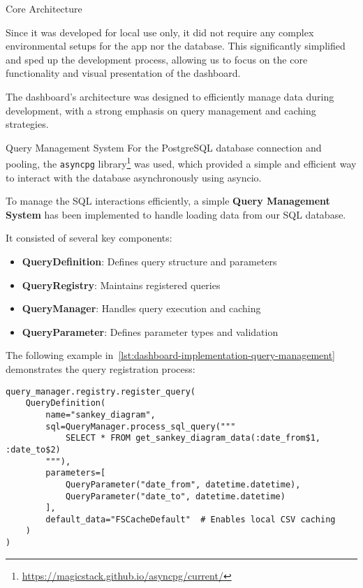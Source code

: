 \begin{section}{Core Architecture}
	\label{sec:implementation-core-architecture}

	Since it was developed for local use only, it did not require any complex environmental setups for the app nor the database.
	This significantly simplified and sped up the development process, allowing us to focus on the core functionality and visual presentation of the dashboard.

	The dashboard's architecture was designed to efficiently manage data during development, with a strong emphasis on query management and caching strategies.

	\begin{subsection}{Query Management System}
		\label{subsec:implementation-core-architecture-query-management}
		For the PostgreSQL database connection and pooling, the \texttt{asyncpg} library\footnote{\url{https://magicstack.github.io/asyncpg/current/}} was used,
		which provided a simple and efficient way to interact with the database asynchronously using asyncio.

		To manage the SQL interactions efficiently, a simple \textbf{Query Management System} has been implemented to handle loading data from our SQL database.

		It consisted of several key components:
		\begin{itemize}
			\item \textbf{QueryDefinition}: Defines query structure and parameters
			\item \textbf{QueryRegistry}: Maintains registered queries
			\item \textbf{QueryManager}: Handles query execution and caching
			\item \textbf{QueryParameter}: Defines parameter types and validation
		\end{itemize}

		The following example in~\autoref{lst:dashboard-implementation-query-management} demonstrates the query registration process:

		\begin{listing}[H]
			\caption{Query Management Example}
			\begin{verbatim}
query_manager.registry.register_query(
    QueryDefinition(
        name="sankey_diagram",
        sql=QueryManager.process_sql_query("""
            SELECT * FROM get_sankey_diagram_data(:date_from$1, :date_to$2)
        """),
        parameters=[
            QueryParameter("date_from", datetime.datetime),
            QueryParameter("date_to", datetime.datetime)
        ],
        default_data="FSCacheDefault"  # Enables local CSV caching
    )
)
			\end{verbatim}
			\label{lst:dashboard-implementation-query-management}
		\end{listing}


\end{subsection}
\end{section}
